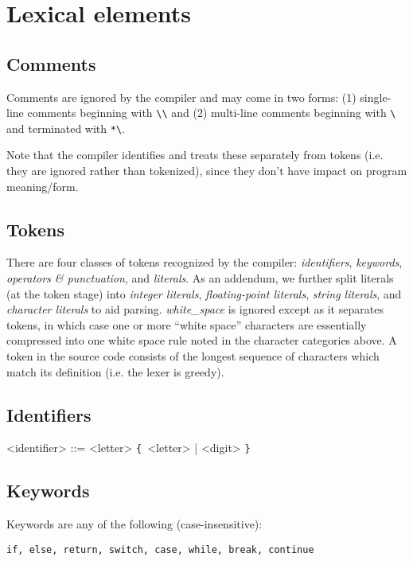 \documentclass{article}
\def\lrep{\synshortsoff\texttt{\{}\synshorts~}
\def\rrep{\synshortsoff\texttt{\}}\synshorts~}
\begin{document}
\section*{Lexical elements}
\subsection*{Comments}
Comments are ignored by the compiler and may come in two forms: (1)
single-line comments beginning with
\texttt{\textbackslash\textbackslash} and (2) multi-line comments
beginning with \texttt{\textbackslash*} and terminated with
\texttt{*\textbackslash}.

Note that the compiler identifies and treats these separately from
tokens (i.e. they are ignored rather than tokenized), since they don't
have impact on program meaning/form.

\subsection*{Tokens}
There are four classes of tokens recognized by the compiler: \emph{identifiers},
\emph{keywords}, \emph{operators \& punctuation}, and \emph{literals}. As an
addendum, we further split literals (at the token stage) into \emph{integer
literals}, \emph{floating-point literals}, \emph{string literals}, and
\emph{character literals} to aid parsing. \emph{white\_space} is ignored except
as it separates tokens, in which case one or more ``white space'' characters are
essentially compressed into one white space rule noted in the character
categories above. A token in the source code consists of the longest sequence of
characters which match its definition (i.e. the lexer is greedy).

\subsection*{Identifiers}
\begin{grammar}
  <identifier> ::= <letter> \lrep <letter> | <digit> \rrep
\end{grammar}

\subsection*{Keywords}
Keywords are any of the following (case-insensitive):
\begin{verbatim}
if, else, return, switch, case, while, break, continue
\end{verbatim}
\end{document}
